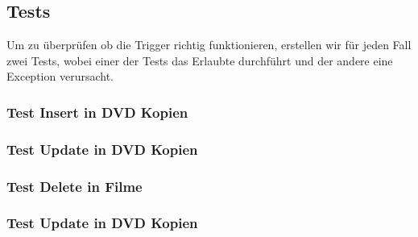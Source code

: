 \documentclass[11pt,a4paper,parskip=half]{scrartcl}
\begin{document}
\subsection{Tests}
Um zu überprüfen ob die Trigger richtig funktionieren, erstellen wir für jeden Fall zwei Tests, wobei einer der Tests das Erlaubte durchführt und der andere eine Exception verursacht.

\subsubsection{Test Insert in DVD Kopien}


\subsubsection{Test Update in DVD Kopien}


\subsubsection{Test Delete in Filme}


\subsubsection{Test Update in DVD Kopien}
\end{document}

